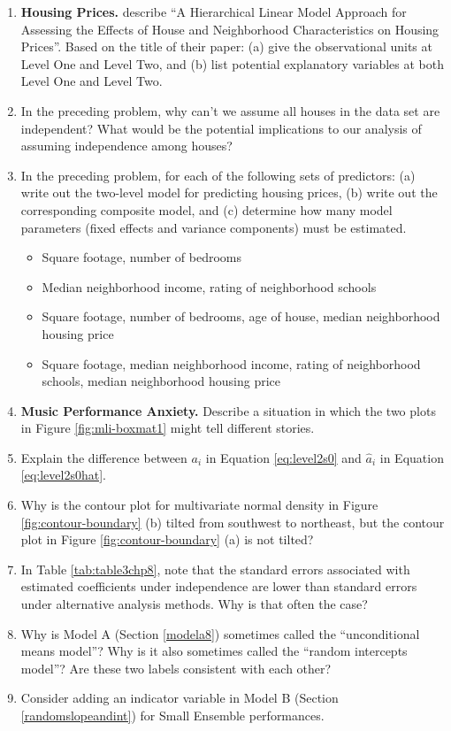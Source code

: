 \documentclass[
]{krantz}
\providecommand{\tightlist}{%
  \setlength{\itemsep}{0pt}\setlength{\parskip}{0pt}}
\begin{document}
\begin{enumerate}
\def\labelenumi{\arabic{enumi}.}
\item
  \textbf{Housing Prices.} \citet{Brown2004} describe ``A Hierarchical Linear Model Approach for Assessing the Effects of House and Neighborhood Characteristics on Housing Prices''. Based on the title of their paper: (a) give the observational units at Level One and Level Two, and (b) list potential explanatory variables at both Level One and Level Two.
\item
  In the preceding problem, why can't we assume all houses in the data set are independent? What would be the potential implications to our analysis of assuming independence among houses?
\item
  In the preceding problem, for each of the following sets of predictors: (a) write out the two-level model for predicting housing prices, (b) write out the corresponding composite model, and (c) determine how many model parameters (fixed effects and variance components) must be estimated.

  \begin{itemize}
  \tightlist
  \item
    Square footage, number of bedrooms
  \item
    Median neighborhood income, rating of neighborhood schools
  \item
    Square footage, number of bedrooms, age of house, median neighborhood housing price
  \item
    Square footage, median neighborhood income, rating of neighborhood schools, median neighborhood housing price
  \end{itemize}
\item
  \textbf{Music Performance Anxiety.} Describe a situation in which the two plots in Figure \ref{fig:mli-boxmat1} might tell different stories.
\item
  Explain the difference between \(a_{i}\) in Equation \eqref{eq:level2s0} and \(\hat{a}_{i}\) in Equation \eqref{eq:level2s0hat}.
\item
  Why is the contour plot for multivariate normal density in Figure \ref{fig:contour-boundary} (b) tilted from southwest to northeast, but the contour plot in Figure \ref{fig:contour-boundary} (a) is not tilted?
\item
  In Table \ref{tab:table3chp8}, note that the standard errors associated with estimated coefficients under independence are lower than standard errors under alternative analysis methods. Why is that often the case?
\item
  Why is Model A (Section \ref{modela8}) sometimes called the ``unconditional means model''? Why is it also sometimes called the ``random intercepts model''? Are these two labels consistent with each other?
\item
  Consider adding an indicator variable in Model B (Section \ref{randomslopeandint}) for Small Ensemble performances.


\end{enumerate}
\end{document}
